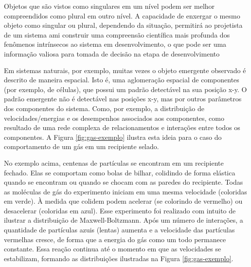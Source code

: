     Objetos que são vistos como singulares em um nível podem ser melhor compreendidos como plural em outro nível. A capacidade de enxergar o mesmo objeto como singular ou plural, dependendo da situação, permitirá ao projetista de um sistema \acrshort{ami} construir uma compreensão científica mais profunda dos fenômenos intrínsecos ao sistema em desenvolvimento, o que pode ser uma informação valiosa para tomada de decisão na etapa de desenvolvimento
    
    Em sistemas naturais, por exemplo, muitas vezes o objeto emergente observado é descrito de maneira espacial. Isto é, uma aglomeração espacial de componentes (por exemplo, de células), que possui um padrão detectável na sua posição x-y. O padrão emergente não é detectável nas posições x-y, mas por outros parâmetros dos componentes do sistema. Como, por exemplo, a distribuição de velocidades/energias e os desempenhos associados aos componentes, como resultado de uma rede complexa de relacionamentos e interações entre todos os componentes. A Figura \ref{fig:gas-exemplo} ilustra esta ideia para o caso do comportamento de um gás em um recipiente selado. 
    
    \begin{figure}[h!]
        \centering
    \end{figure}
    
    
    No exemplo acima, centenas de partículas se encontram em um recipiente fechado. Elas se comportam como bolas de bilhar, colidindo de forma elástica quando se encontram ou quando se chocam com as paredes do recipiente. Todas as moléculas de gás do experimento iniciam em uma mesma velocidade (coloridas em verde). À medida que colidem podem acelerar (se colorindo de vermelho) ou desacelerar (coloridas em azul). Esse experimento foi realizado com intuito de ilustrar a distribuição de Maxwell-Boltzmann. Após um número de interações, a quantidade de partículas azuis (lentas) aumenta e a velocidade das partículas vermelhas cresce, de forma que a energia do gás como um todo permanece constante. Essa reação continua até o momento em que as velocidades se estabilizam, formando as distribuições ilustradas na Figura \ref{fig:gas-exemplo}.

